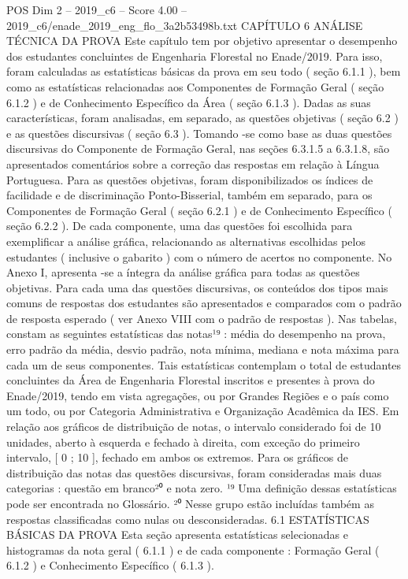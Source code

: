 \begin{textsample}{POS Dim 2 – 2019\_c6 – Score 4.00 – 2019\_c6/enade\_2019\_eng\_flo\_3a2b53498b.txt}  \label{ex:f2_pos_154}
CAPÍTULO 6 ANÁLISE TÉCNICA DA PROVA Este capítulo tem por objetivo apresentar o desempenho dos estudantes concluintes de Engenharia Florestal no Enade/2019.
Para isso, foram calculadas as estatísticas básicas da prova em seu todo ( seção 6.1.1 ), bem como as estatísticas relacionadas aos Componentes de Formação Geral ( seção 6.1.2 ) e de Conhecimento Específico da Área ( seção 6.1.3 ).
Dadas as suas características, foram analisadas, em separado, as questões objetivas ( seção 6.2 ) e as questões discursivas ( seção 6.3 ).
Tomando -se como base as duas questões discursivas do Componente de Formação Geral, nas seções 6.3.1.5 a 6.3.1.8, são apresentados comentários sobre a correção das respostas em relação à Língua Portuguesa.
Para as questões objetivas, foram disponibilizados os índices de facilidade e de discriminação Ponto-Bisserial, também em separado, para os Componentes de Formação Geral ( seção 6.2.1 ) e de Conhecimento Específico ( seção 6.2.2 ).
De cada componente, uma das questões foi escolhida para exemplificar a análise gráfica, relacionando as alternativas escolhidas pelos estudantes ( inclusive o gabarito ) com o número de acertos no componente.
No Anexo I, apresenta -se a íntegra da análise gráfica para todas as questões objetivas.
Para cada uma das questões discursivas, os conteúdos dos tipos mais comuns de respostas dos estudantes são apresentados e comparados com o padrão de resposta esperado ( ver Anexo VIII com o padrão de respostas ).
Nas tabelas, constam as seguintes estatísticas das notas¹⁹ : média do desempenho na prova, erro padrão da média, desvio padrão, nota mínima, mediana e nota máxima para cada um de seus componentes.
Tais estatísticas contemplam o total de estudantes concluintes da Área de Engenharia Florestal inscritos e presentes à prova do Enade/2019, tendo em vista agregações, ou por Grandes Regiões e o país como um todo, ou por Categoria Administrativa e Organização Acadêmica da IES.
Em relação aos gráficos de distribuição de notas, o intervalo considerado foi de 10 unidades, aberto à esquerda e fechado à direita, com exceção do primeiro intervalo, [ 0 ; 10 ], fechado em ambos os extremos.
Para os gráficos de distribuição das notas das questões discursivas, foram consideradas mais duas categorias : questão em branco²⁰ e nota zero. ¹⁹ Uma definição dessas estatísticas pode ser encontrada no Glossário. ²⁰ Nesse grupo estão incluídas também as respostas classificadas como nulas ou desconsideradas. 6.1 ESTATÍSTICAS BÁSICAS DA PROVA Esta seção apresenta estatísticas selecionadas e histogramas da nota geral ( 6.1.1 ) e de cada componente : Formação Geral ( 6.1.2 ) e Conhecimento Específico ( 6.1.3 ).

\end{textsample}
